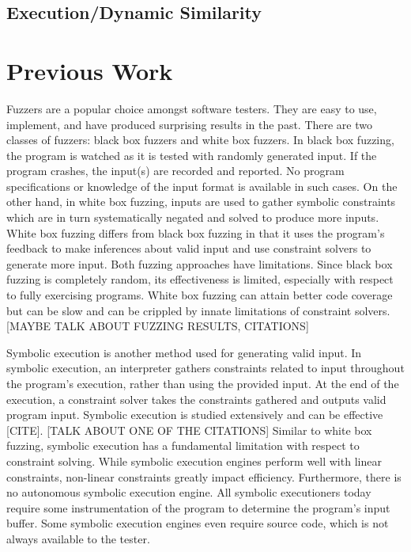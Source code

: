 \documentclass[10pt,twocolumn]{article}
\begin{document}
\subsection{Execution/Dynamic Similarity} \label{bg_dynamicsim}



\section{Previous Work} \label{prevwork}

Fuzzers are a popular choice amongst software testers.
They are easy to use, implement, and have produced surprising results in the past.
There are two classes of fuzzers: black box fuzzers and white box fuzzers.
In black box fuzzing, the program is watched as it is tested with randomly generated input.
If the program crashes, the input(s) are recorded and reported.
No program specifications or knowledge of the input format is available in such cases.
On the other hand, in white box fuzzing, inputs are used to gather symbolic constraints which are in turn systematically negated and solved to produce more inputs.
White box fuzzing differs from black box fuzzing in that it uses the program's feedback to make inferences about valid input and use constraint solvers to generate more input.
Both fuzzing approaches have limitations.
Since black box fuzzing is completely random, its effectiveness is limited, especially with respect to fully exercising programs.
White box fuzzing can attain better code coverage but can be slow and can be crippled by innate limitations of constraint solvers.
[MAYBE TALK ABOUT FUZZING RESULTS, CITATIONS]

Symbolic execution is another method used for generating valid input.
In symbolic execution, an interpreter gathers constraints related to input throughout the program's execution, rather than using the provided input.
At the end of the execution, a constraint solver takes the constraints gathered and outputs valid program input.
Symbolic execution is studied extensively and can be effective [CITE].
[TALK ABOUT ONE OF THE CITATIONS]
Similar to white box fuzzing, symbolic execution has a fundamental limitation with respect to constraint solving.
While symbolic execution engines perform well with linear constraints, non-linear constraints greatly impact efficiency.
Furthermore, there is no autonomous symbolic execution engine.
All symbolic executioners today require some instrumentation of the program to determine the program's input buffer.
Some symbolic execution engines even require source code, which is not always available to the tester.
\end{document}
